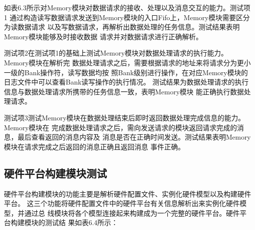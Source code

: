 如表6.3所示对Memory模块对数据请求的接收、处理以及消息交互的能力。测试项1
通过构造读写数据请求发送到Memory模块的入口Fifo上，Memory模块需要区分为读数据请求
以及写数据请求，再解析出数据处理的任务信息。测试结果表明Memory模块能够及时接收数据
请求并对数据请求进行正确解析。

测试项2在测试项1的基础上测试Memory模块对数据处理请求的执行能力。Memory模块在解析完
数据处理请求之后，需要根据请求的地址来将请求分为更小一级的Bank操作符，读写数据均按
照Bank级别进行操作，在对应Memory模块的日志文件中可以查看Bank读写操作的执行情况。
测试结果为数据处理请求的执行信息与数据处理请求所携带的任务信息一致，表明Memory模块
能正确执行数据处理请求。

测试项3测试Memory模块在数据处理结束后即时返回数据处理完成信息的能力。Memory模块在
完成数据处理请求之后，需向发送请求的模块返回请求完成的消息，最后查看返回的消息内容及
消息是否在正确时间发送。测试结果表明Memory模块在请求完成之后返回的消息正确且返回消息
事件正确。

\subsection{硬件平台构建模块测试}

硬件平台构建模块的功能主要是解析硬件配置文件、实例化硬件模型以及构建硬件平台。
这三个功能将硬件配置文件中的硬件平台有关信息解析出来实例化硬件模型，并通过总
线模块将各个模型连接起来构建成为一个完整的硬件平台。硬件平台构建模块的测试结
果如表6.4所示：

